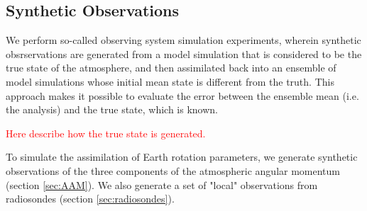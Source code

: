 %


\subsection{Synthetic Observations}

We perform so-called observing system simulation experiments, wherein synthetic obsrservations are generated from a model simulation that is considered to be the true state of the atmosphere, and then assimilated back into an ensemble of model simulations whose initial mean state is different from the truth. 
This approach makes it possible to evaluate the error between the ensemble mean (i.e. the analysis) and the true state, which is known.  

\textcolor{red}{Here describe how the true state is generated.}

To simulate the assimilation of Earth rotation parameters, we generate synthetic observations of the three components of the atmospheric angular momentum (section \ref{sec:AAM}).
We also generate a set of "local" observations from radiosondes (section \ref{sec:radiosondes}).

